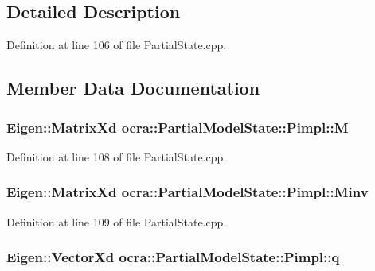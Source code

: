 \subsection{Detailed Description}


Definition at line 106 of file Partial\+State.\+cpp.



\subsection{Member Data Documentation}
\subsubsection[{\texorpdfstring{M}{M}}]{\setlength{\rightskip}{0pt plus 5cm}Eigen\+::\+Matrix\+Xd ocra\+::\+Partial\+Model\+State\+::\+Pimpl\+::M}\hypertarget{structocra_1_1PartialModelState_1_1Pimpl_aac1b2af908cd347c7c295d0461f605b7}{}\label{structocra_1_1PartialModelState_1_1Pimpl_aac1b2af908cd347c7c295d0461f605b7}


Definition at line 108 of file Partial\+State.\+cpp.

\subsubsection[{\texorpdfstring{Minv}{Minv}}]{\setlength{\rightskip}{0pt plus 5cm}Eigen\+::\+Matrix\+Xd ocra\+::\+Partial\+Model\+State\+::\+Pimpl\+::\+Minv}\hypertarget{structocra_1_1PartialModelState_1_1Pimpl_a8fc2e9335c4fc0ff753fdb9850ad7bd5}{}\label{structocra_1_1PartialModelState_1_1Pimpl_a8fc2e9335c4fc0ff753fdb9850ad7bd5}


Definition at line 109 of file Partial\+State.\+cpp.

\subsubsection[{\texorpdfstring{q}{q}}]{\setlength{\rightskip}{0pt plus 5cm}Eigen\+::\+Vector\+Xd ocra\+::\+Partial\+Model\+State\+::\+Pimpl\+::q}\hypertarget{structocra_1_1PartialModelState_1_1Pimpl_a1533bd101072998a086254a0bdd9b9e9}{}\label{structocra_1_1PartialModelState_1_1Pimpl_a1533bd101072998a086254a0bdd9b9e9}



